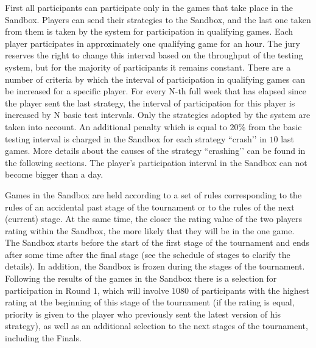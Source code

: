 First all participants can participate only in the games that take place in the Sandbox. Players can send their strategies to the Sandbox, and
the last one taken from them is taken by the system for participation in qualifying games. Each player participates in approximately one qualifying
game for an hour. The jury reserves the right to change this interval based on the throughput of the testing system, but for
the majority of participants it remains constant. There are a number of criteria by which the interval of participation in qualifying games
can be increased for a specific player. For every N-th full week that has elapsed since the player sent the last strategy, the interval
of participation for this player is increased by N basic test intervals. Only the strategies adopted by the system are taken into account. An additional penalty which is equal to $20\%$ from the basic testing interval is charged in the Sandbox for each strategy ``crash’’ in $10$ last games.
More details about the causes of the strategy ``crashing’’ can be found in the following sections. The player’s participation interval in the Sandbox can not become bigger than a day.

Games in the Sandbox are held according to a set of rules corresponding to the rules of an accidental past stage of the tournament or to the rules of the next
(current) stage. At the same time, the closer the rating value of the two players rating within the Sandbox, the more likely that they will be in the
one game. The Sandbox starts before the start of the first stage of the tournament and ends after some time after the final stage (see the schedule
of stages to clarify the details). In addition, the Sandbox is frozen during the stages of the tournament. Following the results of the games in the Sandbox
there is a selection for participation in Round 1, which will involve $1080$ of participants with the highest rating at the beginning of this stage of the tournament
(if the rating is equal, priority is given to the player who previously sent the latest version of his strategy), as well as an additional selection to
the next stages of the tournament, including the Finals.

